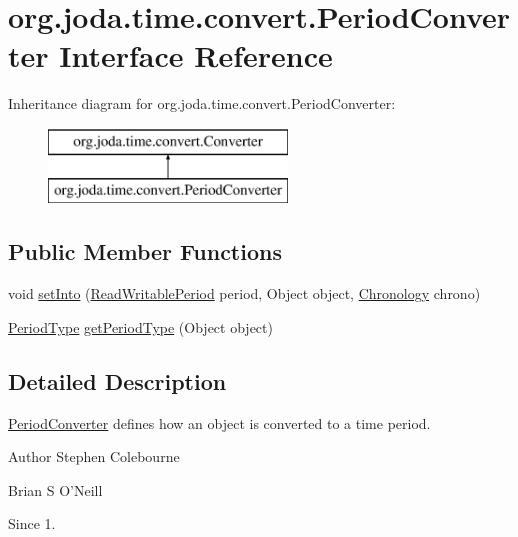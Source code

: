 \hypertarget{interfaceorg_1_1joda_1_1time_1_1convert_1_1_period_converter}{\section{org.\-joda.\-time.\-convert.\-Period\-Converter Interface Reference}
\label{interfaceorg_1_1joda_1_1time_1_1convert_1_1_period_converter}
}
Inheritance diagram for org.\-joda.\-time.\-convert.\-Period\-Converter\-:\begin{figure}[H]
\begin{center}
\leavevmode
\includegraphics[height=2.000000cm]{interfaceorg_1_1joda_1_1time_1_1convert_1_1_period_converter}
\end{center}
\end{figure}
\subsection*{Public Member Functions}
\begin{DoxyCompactItemize}
\item 
void \hyperlink{interfaceorg_1_1joda_1_1time_1_1convert_1_1_period_converter_ad1cb736987bbad9c142a1ed15b284612}{set\-Into} (\hyperlink{interfaceorg_1_1joda_1_1time_1_1_read_writable_period}{Read\-Writable\-Period} period, Object object, \hyperlink{classorg_1_1joda_1_1time_1_1_chronology}{Chronology} chrono)
\item 
\hyperlink{classorg_1_1joda_1_1time_1_1_period_type}{Period\-Type} \hyperlink{interfaceorg_1_1joda_1_1time_1_1convert_1_1_period_converter_afc789671f7398c80c1ecd0aca47719a0}{get\-Period\-Type} (Object object)
\end{DoxyCompactItemize}


\subsection{Detailed Description}
\hyperlink{interfaceorg_1_1joda_1_1time_1_1convert_1_1_period_converter}{Period\-Converter} defines how an object is converted to a time period.

\begin{DoxyAuthor}{Author}
Stephen Colebourne 

Brian S O'Neill 
\end{DoxyAuthor}
\begin{DoxySince}{Since}
1. 
\end{DoxySince}


